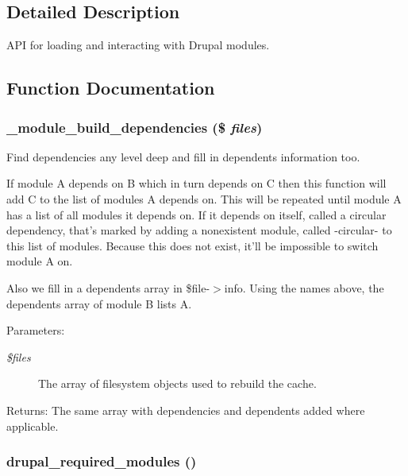 \subsection{Detailed Description}
API for loading and interacting with Drupal modules. 

\subsection{Function Documentation}
\hypertarget{module_8inc_4a43fd8278bb4e660eff9a74aaba3dd4}{
\subsubsection[{\_\-module\_\-build\_\-dependencies}]{\setlength{\rightskip}{0pt plus 5cm}\_\-module\_\-build\_\-dependencies (\$ {\em files})}}
\label{module_8inc_4a43fd8278bb4e660eff9a74aaba3dd4}


Find dependencies any level deep and fill in dependents information too.

If module A depends on B which in turn depends on C then this function will add C to the list of modules A depends on. This will be repeated until module A has a list of all modules it depends on. If it depends on itself, called a circular dependency, that's marked by adding a nonexistent module, called -circular- to this list of modules. Because this does not exist, it'll be impossible to switch module A on.

Also we fill in a dependents array in \$file-$>$info. Using the names above, the dependents array of module B lists A.

\begin{Desc}
\item[Parameters:]
\begin{description}
\item[{\em \$files}]The array of filesystem objects used to rebuild the cache. \end{description}
\end{Desc}
\begin{Desc}
\item[Returns:]The same array with dependencies and dependents added where applicable. \end{Desc}
\hypertarget{module_8inc_029be29693701bd21b6810e8d047c5a8}{
\subsubsection[{drupal\_\-required\_\-modules}]{\setlength{\rightskip}{0pt plus 5cm}drupal\_\-required\_\-modules ()}}
\label{module_8inc_029be29693701bd21b6810e8d047c5a8}



